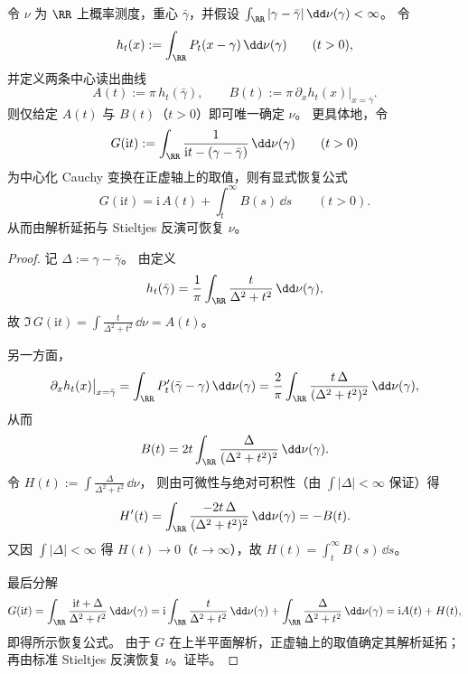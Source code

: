 \begin{proposition}\label{prop:cdim-poisson-central-two-channel-reconstruction}
令 \(\nu\) 为 \(\RR\) 上概率测度，重心 \(\bar\gamma\)，并假设 \(\int_{\RR}|\gamma-\bar\gamma|\,\dd\nu(\gamma)<\infty\)。
令
\[
h_t(x):=\int_{\RR}P_t(x-\gamma)\,\dd\nu(\gamma)\qquad(t>0),
\]
并定义两条中心读出曲线
\[
A(t):=\pi\,h_t(\bar\gamma),
\qquad
B(t):=\pi\,\partial_x h_t(x)\big|_{x=\bar\gamma}.
\]
则仅给定 \(A(t)\) 与 \(B(t)\)（\(t>0\)）即可唯一确定 \(\nu\)。
更具体地，令
\[
G(\mathrm{i}t):=\int_{\RR}\frac{1}{\mathrm{i}t-(\gamma-\bar\gamma)}\,\dd\nu(\gamma)\qquad(t>0)
\]
为中心化 Cauchy 变换在正虚轴上的取值，则有显式恢复公式
\[
\boxed{\;
G(\mathrm{i}t)
=\mathrm{i}\,A(t)+\int_t^\infty B(s)\,\dd s\qquad(t>0).\;}
\]
从而由解析延拓与 Stieltjes 反演可恢复 \(\nu\)。
\end{proposition}
\begin{proof}
记 \(\Delta:=\gamma-\bar\gamma\)。
由定义
\[
h_t(\bar\gamma)=\frac{1}{\pi}\int_{\RR}\frac{t}{\Delta^2+t^2}\,\dd\nu(\gamma),
\]
故 \(\Im\,G(\mathrm{i}t)=\int \frac{t}{\Delta^2+t^2}\,\dd\nu=A(t)\)。
\par
另一方面，
\[
\partial_x h_t(x)\big|_{x=\bar\gamma}
=\int_{\RR}P_t'(\bar\gamma-\gamma)\,\dd\nu(\gamma)
=\frac{2}{\pi}\int_{\RR}\frac{t\,\Delta}{(\Delta^2+t^2)^2}\,\dd\nu(\gamma),
\]
从而
\[
B(t)=2t\int_{\RR}\frac{\Delta}{(\Delta^2+t^2)^2}\,\dd\nu(\gamma).
\]
令
\(
H(t):=\int \frac{\Delta}{\Delta^2+t^2}\,\dd\nu
\)，
则由可微性与绝对可积性（由 \(\int|\Delta|<\infty\) 保证）得
\[
H'(t)=\int_{\RR}\frac{-2t\,\Delta}{(\Delta^2+t^2)^2}\,\dd\nu(\gamma)=-B(t).
\]
又因 \(\int|\Delta|<\infty\) 得 \(H(t)\to 0\)（\(t\to\infty\)），故
\(
H(t)=\int_t^\infty B(s)\,\dd s
\)。
\par
最后分解
\[
G(\mathrm{i}t)
=\int_{\RR}\frac{\mathrm{i}t+\Delta}{\Delta^2+t^2}\,\dd\nu(\gamma)
=\mathrm{i}\int_{\RR}\frac{t}{\Delta^2+t^2}\,\dd\nu(\gamma)+\int_{\RR}\frac{\Delta}{\Delta^2+t^2}\,\dd\nu(\gamma)
=\mathrm{i}A(t)+H(t),
\]
即得所示恢复公式。
由于 \(G\) 在上半平面解析，正虚轴上的取值确定其解析延拓；再由标准 Stieltjes 反演恢复 \(\nu\)。证毕。
\end{proof}

